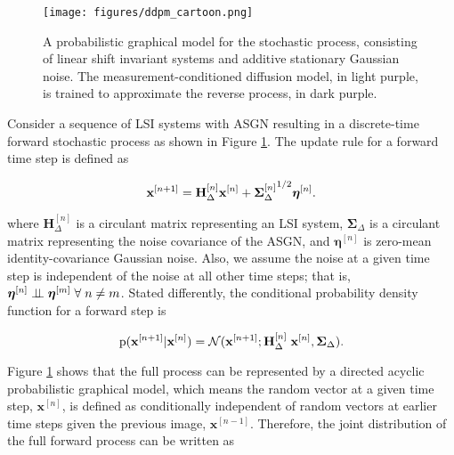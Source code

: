 \documentclass[12pt,]{article}
\newcommand{\indep}{\perp \!\!\! \perp}
\begin{document}
\begin{figure}
    \centering
    \texttt{[image: figures/ddpm\_cartoon.png]}
    \caption{A probabilistic graphical model for the stochastic process, consisting of linear shift invariant systems and additive stationary Gaussian noise. The  measurement-conditioned diffusion model, in light purple, is trained to approximate the reverse process, in dark purple.}
    \label{fig:network_diagram}
\end{figure}


Consider a sequence of LSI systems with ASGN resulting in a discrete-time forward stochastic process as shown in Figure \ref{fig:network_diagram}. The update rule for a forward time step is defined as

\begin{equation}
    \mathbf{x}^{[n+1]} = \mathbf{H}_\Delta^{[n]} \mathbf{x}^{[n]} + {\boldsymbol{\Sigma}_\Delta^{[n]}}^{ \hspace{0mm}1/2}\boldsymbol{\eta}^{[n]}  .
    \label{eq:discrete_forward_update}
\end{equation} 

\noindent where $\mathbf{H}_\Delta^{[n]}$ is a circulant matrix representing an LSI system, $\boldsymbol{\Sigma}_\Delta$ is a circulant matrix representing the noise covariance of the ASGN,  and $\boldsymbol{\eta}^{[n]}$  is zero-mean identity-covariance Gaussian noise. Also, we assume the noise at a given time step is independent of the noise at all other time steps; that is, $\boldsymbol{\eta}^{[n]} \indep \boldsymbol{\eta}^{[m]} \hspace{1mm} \forall \hspace{1mm} n \neq m$. Stated differently, the conditional probability density function for a forward step is

\begin{equation}
    \text{p}(\mathbf{x}^{[n+1]}|\mathbf{x}^{[n]}) = \mathcal{N}(\mathbf{x}^{[n+1]} ; \mathbf{H}_\Delta^{[n]} \hspace{1mm} \mathbf{x}^{[n]},  \boldsymbol{\Sigma}_\Delta) .
    \label{eq:forward_step}
\end{equation}


Figure \ref{fig:network_diagram} shows that the full process can be represented by a directed acyclic probabilistic graphical model, which means the random vector at a given time step, $\mathbf{x}^{[n]}$, is defined as conditionally independent of random vectors at earlier time steps given the previous image, $\mathbf{x}^{[n-1]}$. Therefore, the joint distribution of the full forward process can be written as
\end{document}
